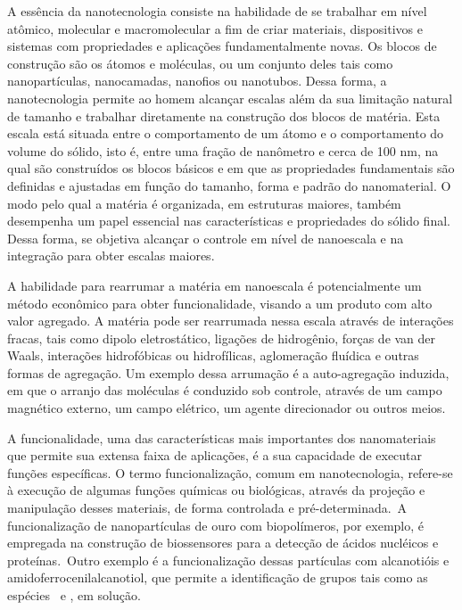 \documentclass[10pt]{scrartcl}
\begin{document}
A essência da nanotecnologia consiste na habilidade de se trabalhar em nível atômico, molecular e macromolecular a fim de criar materiais, dispositivos e sistemas com propriedades e aplicações fundamentalmente novas. Os blocos de construção são os átomos e moléculas, ou um conjunto deles tais como nanopartículas, nanocamadas, nanofios ou nanotubos. Dessa forma, a nanotecnologia permite ao homem alcançar escalas além da sua limitação natural de tamanho e trabalhar diretamente na construção dos blocos de matéria. Esta escala está situada entre o comportamento de um átomo e o comportamento do volume do sólido, isto é, entre uma fração de nanômetro e cerca de 100 nm, na qual são construídos os blocos básicos e em que as propriedades fundamentais são definidas e ajustadas em função do tamanho, forma e padrão do nanomaterial. O modo pelo qual a matéria é organizada, em estruturas maiores, também desempenha um papel essencial nas características e propriedades do sólido final. Dessa forma, se objetiva alcançar o controle em nível de nanoescala e na integração para obter escalas maiores.

A habilidade para rearrumar a matéria em nanoescala é potencialmente um método econômico para obter funcionalidade, visando a um produto com alto valor agregado. A matéria pode ser rearrumada nessa escala através de interações fracas, tais como dipolo eletrostático, ligações de hidrogênio, forças de van der Waals, interações hidrofóbicas ou hidrofílicas, aglomeração fluídica e outras formas de agregação. Um exemplo dessa arrumação é a auto-agregação induzida, em que o arranjo das moléculas é conduzido sob controle, através de um campo magnético externo, um campo elétrico, um agente direcionador ou outros meios.

A funcionalidade, uma das características mais importantes dos nanomateriais que permite sua extensa faixa de aplicações, é a sua capacidade de executar funções específicas. O termo funcionalização, comum em nanotecnologia, refere-se à execução de algumas funções químicas ou biológicas, através da projeção e manipulação desses materiais, de forma controlada e pré-determinada. A funcionalização de nanopartículas de ouro com biopolímeros, por exemplo, é empregada na construção de biossensores para a detecção de ácidos nucléicos e proteínas. Outro exemplo é a funcionalização dessas partículas com alcanotióis e amidoferrocenilalcanotiol, que permite a identificação de grupos tais como as espécies  e , em solução.
\end{document}
